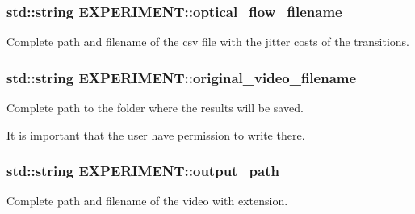 \subsubsection[{\texorpdfstring{optical\+\_\+flow\+\_\+filename}{optical\_flow\_filename}}]{\setlength{\rightskip}{0pt plus 5cm}std\+::string E\+X\+P\+E\+R\+I\+M\+E\+N\+T\+::optical\+\_\+flow\+\_\+filename}\hypertarget{structEXPERIMENT_a8b5ca464e785c2b80c16c9e022b7c31a}{}\label{structEXPERIMENT_a8b5ca464e785c2b80c16c9e022b7c31a}


Complete path and filename of the csv file with the jitter costs of the transitions. 

\subsubsection[{\texorpdfstring{original\+\_\+video\+\_\+filename}{original\_video\_filename}}]{\setlength{\rightskip}{0pt plus 5cm}std\+::string E\+X\+P\+E\+R\+I\+M\+E\+N\+T\+::original\+\_\+video\+\_\+filename}\hypertarget{structEXPERIMENT_a3ce2700a31e4c1b808caceab4626ff06}{}\label{structEXPERIMENT_a3ce2700a31e4c1b808caceab4626ff06}


Complete path to the folder where the results will be saved. 

It is important that the user have permission to write there. 
\subsubsection[{\texorpdfstring{output\+\_\+path}{output\_path}}]{\setlength{\rightskip}{0pt plus 5cm}std\+::string E\+X\+P\+E\+R\+I\+M\+E\+N\+T\+::output\+\_\+path}\hypertarget{structEXPERIMENT_a05ae2a5fbc8660bdb535937d4a446698}{}\label{structEXPERIMENT_a05ae2a5fbc8660bdb535937d4a446698}


Complete path and filename of the video with extension. 

